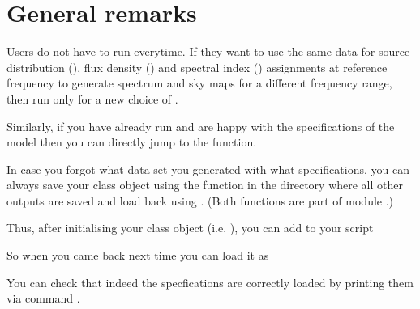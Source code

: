 \documentclass[letterpaper,10pt,english]{sphinxmanual}
\begin{document}
\sphinxstepscope


\chapter{General remarks}
\label{\detokenize{genrem:general-remarks}}\label{\detokenize{genrem::doc}}
\sphinxAtStartPar
Users do not have to run  everytime. If they want to use
the same data for source distribution (), flux density
() and spectral index () assignments
at reference frequency to generate spectrum and sky maps for a different
frequency range, then run only  for a new choice of
.

\sphinxAtStartPar
Similarly, if you have already run  and are happy with the
specifications of the model then you can directly jump to the
 function.

\sphinxAtStartPar
In case you forgot what data set you generated with what specifications,
you can always save your class object using the function
 in the directory where all
other outputs are saved and load back using . (Both
functions are part of module .)

\sphinxAtStartPar
Thus, after initialising your class object (i.e.
), you can add to your script

\begin{sphinxVerbatim}[commandchars=\\\{\}]
\end{sphinxVerbatim}

\sphinxAtStartPar
So when you came back next time you can load it as

\begin{sphinxVerbatim}[commandchars=\\\{\}]
\end{sphinxVerbatim}

\sphinxAtStartPar
You can check that indeed the specfications are correctly loaded by
printing them via command .



\renewcommand{\indexname}{Index}
\printindex
\end{document}

